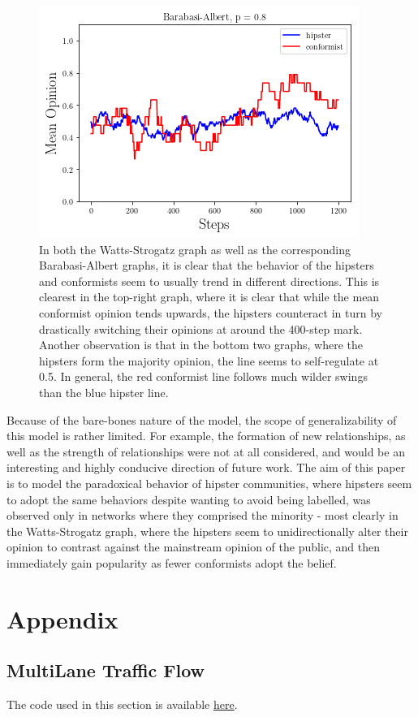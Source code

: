 \documentclass{article}
\begin{document}
\begin{figure}[h!]
\includegraphics[scale = 0.6]{ba4.png}

\caption{In both the Watts-Strogatz graph as well as the corresponding Barabasi-Albert graphs, it is clear that the behavior of the hipsters and conformists seem to usually trend in different directions. This is clearest in the top-right graph, where it is clear that while the mean conformist opinion tends upwards, the hipsters counteract in turn by drastically switching their opinions at around the 400-step mark. Another observation is that in the bottom two graphs, where the hipsters form the majority opinion, the line seems to self-regulate at 0.5. In general, the red conformist line follows much wilder swings than the blue hipster line.}
\end{figure}

Because of the bare-bones nature of the model, the scope of generalizability of this model is rather limited. For example, the formation of new relationships, as well as the strength of relationships were not at all considered, and would be an interesting and highly conducive direction of future work. The aim of this paper is to model the paradoxical behavior of hipster communities, where hipsters seem to adopt the same behaviors despite wanting to avoid being labelled, was observed only in networks where they comprised the minority - most clearly in the Watts-Strogatz graph, where the hipsters seem to unidirectionally alter their opinion to contrast against the mainstream opinion of the public, and then immediately gain popularity as fewer conformists adopt the belief. \\




\newpage
\section*{Appendix}


\subsection*{MultiLane Traffic Flow}
The code used in this section is available \href{https://github.com/thetruejacob/CS166/blob/master/Rickert%20Model.ipynb}{here}.
\end{document}
